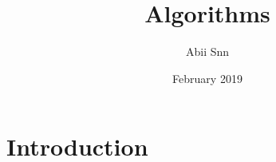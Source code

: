\documentclass{article}
\title{Algorithms}
\author{Abii Snn }
\date{February 2019}
\begin{document}
\maketitle

\section{Introduction}
\end{document}
